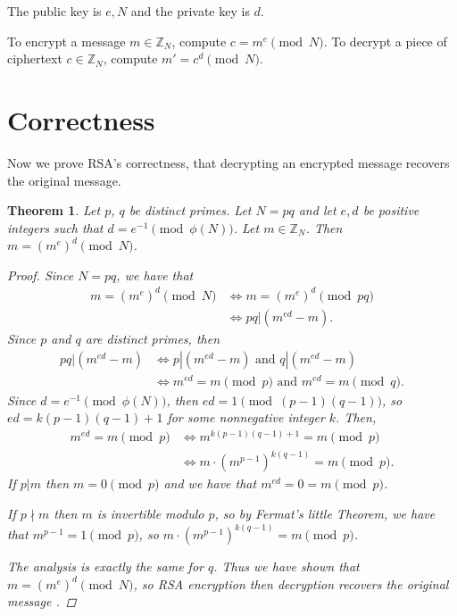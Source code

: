 \documentclass[12pt, letterpaper]{article}
\newtheorem{thm}{Theorem}[section]
\theoremstyle{definition}
\begin{document}
The public key is $e, N$ and the private key is $d$.

To encrypt a message $m \in \mathbb{Z}_N$, compute $c = m^e \pmod N$.
To decrypt a piece of ciphertext $c \in \mathbb{Z}_N$, compute $m' = c^d \pmod N$.


\section{Correctness} \label{sec_correctness}
Now we prove RSA's correctness, that decrypting an encrypted message
recovers the original message.

\begin{thm}
  Let $p$, $q$ be distinct primes. Let $N = pq$ and let $e, d$ be positive integers
  such that $d = e^{-1} \pmod{\phi(N)}$.
  Let $m \in \mathbb{Z}_N$. Then $m = (m^e)^d \pmod N$.

  \begin{proof}
    Since $N = pq$, we have that
    \begin{align*}
      m = (m^e)^d \pmod N &\iff m = (m^e)^d \pmod{pq} \\
      &\iff pq | (m^{ed} - m).
    \end{align*}
    Since $p$ and $q$ are distinct primes, then 
    \begin{align*}
      pq | (m^{ed} - m) &\iff p | (m^{ed} - m) \text{ and } q | (m^{ed} - m) \\
                        &\iff m^{ed} = m \pmod p \text{ and } m^{ed} = m \pmod q.
    \end{align*}
    Since $d = e^{-1} \pmod{\phi(N)}$, then $ed = 1 \pmod{(p-1)(q-1)}$, so $ed = k(p-1)(q-1) + 1$
    for some nonnegative integer $k$. Then,
    \begin{align*}
      m^{ed} = m \pmod p &\iff m^{k(p-1)(q-1) + 1} = m \pmod p \\
                        &\iff m \cdot (m^{p-1})^{k(q-1)} = m \pmod p.
    \end{align*}
    If $p | m$ then $m = 0 \pmod p$ and we have that $m^{ed} = 0 = m \pmod p$.

    If $p \nmid m$ then $m$ is invertible modulo $p$, so by Fermat's little Theorem,
    we have that $m^{p-1} = 1 \pmod p$, so $m \cdot (m^{p-1})^{k(q-1)} = m \pmod p$.

    The analysis is exactly the same for $q$. Thus we have shown that $m = (m^e)^d \pmod N$,
    so RSA encryption then decryption recovers the original message \cite{conrad_rsa}.
  \end{proof}
\end{thm}
\end{document}
